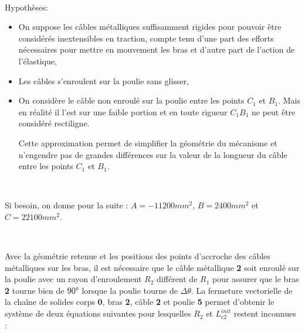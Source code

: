 ~\

Hypothèses:
\begin{itemize}
 \item ­On suppose les câbles métalliques suffisamment rigides pour pouvoir être considérés inextensibles en traction, compte tenu d'une part des efforts nécessaires pour mettre en mouvement les bras et d'autre part de l'action de l'élastique,
 \item Les câbles s'enroulent sur la poulie sans glisser,
­ \item On considère le câble non enroulé sur la poulie entre les points $C_1$ et $B_1$. Mais en réalité il l'est sur une faible portion et en toute rigueur $C_1B_1$ ne peut être considéré rectiligne.

Cette approximation permet de simplifier la géométrie du mécanisme et n'engendre
pas de grandes différences sur la valeur de la longueur du câble entre les points $C_1$ et $B_1$.
\end{itemize}

\newpage




~\

Si besoin, on donne pour la suite : $A=-11200mm^2$, $B=2400mm^2$ et $C=22100mm^2$.


~\

Avec la géométrie retenue et les positions des points d'accroche des câbles métalliques sur les bras, il est nécessaire que le câble métallique \textbf{2} soit enroulé sur la poulie avec un rayon d'enroulement $R_2$ différent de $R_1$ pour assurer que le bras \textbf{2} tourne bien de $90\degree$ lorsque la poulie tourne de $\Delta\theta$. La fermeture vectorielle de la chaîne de solides corps \textbf{0}, bras \textbf{2}, câble \textbf{2} et poulie \textbf{5} permet d'obtenir le système de deux équations suivantes pour lesquelles $R_2$ et $L_{c2}^{init}$ restent inconnues :

